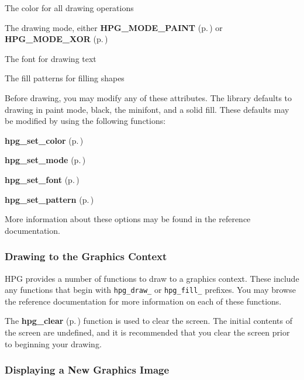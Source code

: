 \begin{CompactItemize}
\item 
 The color for all drawing operations \item 
 The drawing mode, either {\bf HPG\_\-MODE\_\-PAINT} {\rm (p.\,\pageref{hpgraphics_8h_a0})} or {\bf HPG\_\-MODE\_\-XOR} {\rm (p.\,\pageref{hpgraphics_8h_a1})} \item 
 The font for drawing text \item 
 The fill patterns for filling shapes\end{CompactItemize}
Before drawing, you may modify any of these attributes. The library defaults to drawing in paint mode, black, the minifont, and a solid fill. These defaults may be modified by using the following functions:

\begin{CompactItemize}
\item 
 {\bf hpg\_\-set\_\-color} {\rm (p.\,\pageref{hpgraphics_8h_a63})} \item 
 {\bf hpg\_\-set\_\-mode} {\rm (p.\,\pageref{hpgraphics_8h_a65})} \item 
 {\bf hpg\_\-set\_\-font} {\rm (p.\,\pageref{hpgraphics_8h_a69})} \item 
 {\bf hpg\_\-set\_\-pattern} {\rm (p.\,\pageref{hpgraphics_8h_a67})}\end{CompactItemize}
More information about these options may be found in the reference documentation.

\subsubsection{Drawing to the Graphics Context}\label{drawing}


HPG provides a number of functions to draw to a graphics context. These include any functions that begin with {\tt hpg\_\-draw\_\-} or {\tt hpg\_\-fill\_\-} prefixes. You may browse the reference documentation for more information on each of these functions.

The {\bf hpg\_\-clear} {\rm (p.\,\pageref{hpgraphics_8h_a39})} function is used to clear the screen. The initial contents of the screen are undefined, and it is recommended that you clear the screen prior to beginning your drawing.

\subsubsection{Displaying a New Graphics Image}\label{display}


